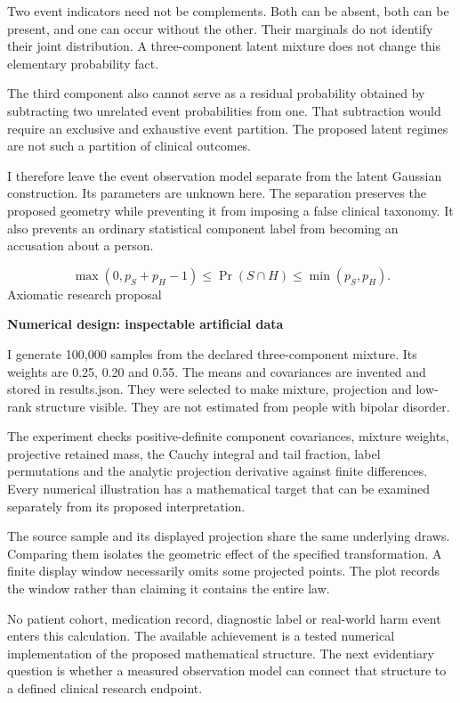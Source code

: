 \documentclass[10pt]{article}
\begin{document}
Two event indicators need not be complements. Both can be absent, both can be present, and one can occur without the other. Their marginals do not identify their joint distribution. A three-component latent mixture does not change this elementary probability fact.\par
The third component also cannot serve as a residual probability obtained by subtracting two unrelated event probabilities from one. That subtraction would require an exclusive and exhaustive event partition. The proposed latent regimes are not such a partition of clinical outcomes.\par
I therefore leave the event observation model separate from the latent Gaussian construction. Its parameters are unknown here. The separation preserves the proposed geometry while preventing it from imposing a false clinical taxonomy. It also prevents an ordinary statistical component label from becoming an accusation about a person.\par
\[\max(0,p_S+p_H-1)\leq\Pr(S\cap H)\leq\min(p_S,p_H).\]
\clearpage
{\small\color{accent}Axiomatic research proposal}\par
{\LARGE\bfseries\color{ink}Numerical design: inspectable artificial data}\par\vspace{7pt}
I generate 100,000 samples from the declared three-component mixture. Its weights are 0.25, 0.20 and 0.55. The means and covariances are invented and stored in results.json. They were selected to make mixture, projection and low-rank structure visible. They are not estimated from people with bipolar disorder.\par
The experiment checks positive-definite component covariances, mixture weights, projective retained mass, the Cauchy integral and tail fraction, label permutations and the analytic projection derivative against finite differences. Every numerical illustration has a mathematical target that can be examined separately from its proposed interpretation.\par
The source sample and its displayed projection share the same underlying draws. Comparing them isolates the geometric effect of the specified transformation. A finite display window necessarily omits some projected points. The plot records the window rather than claiming it contains the entire law.\par
No patient cohort, medication record, diagnostic label or real-world harm event enters this calculation. The available achievement is a tested numerical implementation of the proposed mathematical structure. The next evidentiary question is whether a measured observation model can connect that structure to a defined clinical research endpoint.\par
\end{document}
